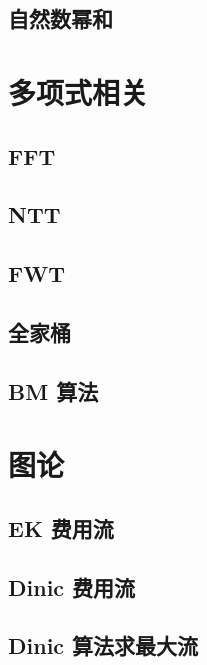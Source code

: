 \documentclass[a4paper,12pt]{article}
\begin{document}
\subsection{自然数幂和}


\section{多项式相关}

\subsection{FFT}

\subsection{NTT}

\subsection{FWT}

\subsection{全家桶}

\subsection{BM 算法}


\section{图论}

\subsection{EK 费用流}

\subsection{Dinic 费用流}

\subsection{Dinic 算法求最大流}

\end{document}

